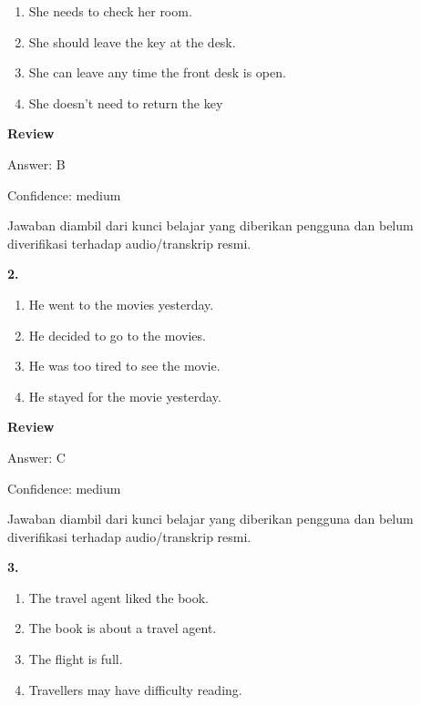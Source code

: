 \documentclass[12pt]{article}
\begin{document}
\begin{enumerate}[label=(\Alph*),leftmargin=*,itemsep=0.2em]
\item She needs to check her room.
\item She should leave the key at the desk.
\item She can leave any time the front desk is open.
\item She doesn't need to return the key
\end{enumerate}
\par
\begingroup
\setlength{\parskip}{0pt}
\setlength{\parindent}{0pt}
\textbf{Review}\par
Answer: B\par
Confidence: medium\par
Jawaban diambil dari kunci belajar yang diberikan pengguna dan belum diverifikasi terhadap audio/transkrip resmi.\par
\endgroup
\par
\vspace{0.25\baselineskip}
\noindent\textbf{2.}
\begin{enumerate}[label=(\Alph*),leftmargin=*,itemsep=0.2em]
\item He went to the movies yesterday.
\item He decided to go to the movies.
\item He was too tired to see the movie.
\item He stayed for the movie yesterday.
\end{enumerate}
\par
\begingroup
\setlength{\parskip}{0pt}
\setlength{\parindent}{0pt}
\textbf{Review}\par
Answer: C\par
Confidence: medium\par
Jawaban diambil dari kunci belajar yang diberikan pengguna dan belum diverifikasi terhadap audio/transkrip resmi.\par
\endgroup
\par
\vspace{0.25\baselineskip}
\noindent\textbf{3.}
\begin{enumerate}[label=(\Alph*),leftmargin=*,itemsep=0.2em]
\item The travel agent liked the book.
\item The book is about a travel agent.
\item The flight is full.
\item Travellers may have difficulty reading.
\end{enumerate}
\end{document}
